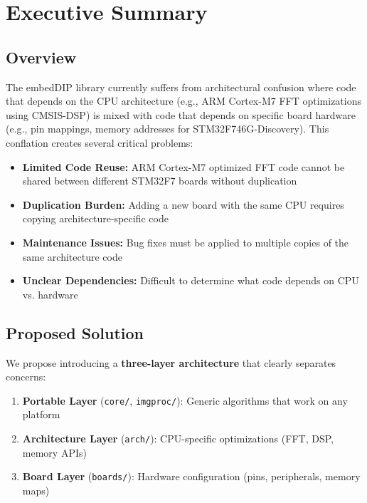 \documentclass[11pt,a4paper]{article}
\begin{document}
\newpage

\tableofcontents

\newpage

\section{Executive Summary}

\subsection{Overview}

The embedDIP library currently suffers from architectural confusion where code that depends on the CPU architecture (e.g., ARM Cortex-M7 FFT optimizations using CMSIS-DSP) is mixed with code that depends on specific board hardware (e.g., pin mappings, memory addresses for STM32F746G-Discovery). This conflation creates several critical problems:

\begin{itemize}
    \item \textbf{Limited Code Reuse:} ARM Cortex-M7 optimized FFT code cannot be shared between different STM32F7 boards without duplication
    \item \textbf{Duplication Burden:} Adding a new board with the same CPU requires copying architecture-specific code
    \item \textbf{Maintenance Issues:} Bug fixes must be applied to multiple copies of the same architecture code
    \item \textbf{Unclear Dependencies:} Difficult to determine what code depends on CPU vs. hardware
\end{itemize}

\subsection{Proposed Solution}

We propose introducing a \textbf{three-layer architecture} that clearly separates concerns:

\begin{enumerate}
    \item \textbf{Portable Layer} (\texttt{core/}, \texttt{imgproc/}): Generic algorithms that work on any platform
    \item \textbf{Architecture Layer} (\texttt{arch/}): CPU-specific optimizations (FFT, DSP, memory APIs)
    \item \textbf{Board Layer} (\texttt{boards/}): Hardware configuration (pins, peripherals, memory maps)
\end{enumerate}
\end{document}
